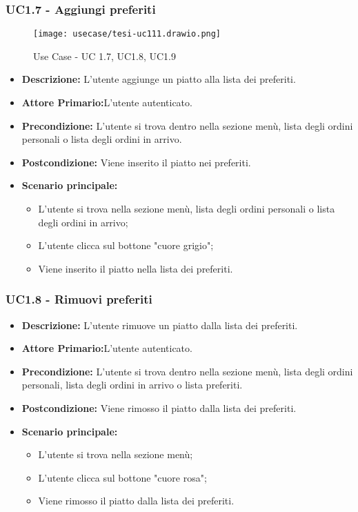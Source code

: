 \subsubsection{UC1.7 - Aggiungi preferiti}
\begin{figure}[H]
    \centering
    \texttt{[image: usecase/tesi-uc111.drawio.png]}
    \caption{Use Case - UC 1.7, UC1.8, UC1.9}
\end{figure}
\begin{itemize}
    \item \textbf{Descrizione:} L'utente aggiunge un piatto alla lista dei preferiti.
    \item \textbf{Attore Primario:}L'utente autenticato.
    \item \textbf{Precondizione:} L'utente si trova dentro nella sezione menù, lista degli ordini personali o lista degli ordini in arrivo.
    \item \textbf{Postcondizione:} Viene inserito il piatto nei preferiti.
    \item \textbf{Scenario principale:}
    \begin{itemize}
        \item L'utente si trova nella sezione menù, lista degli ordini personali o lista degli ordini in arrivo;
        \item L'utente clicca sul bottone "cuore grigio";
        \item Viene inserito il piatto nella lista dei preferiti.
    \end{itemize}
\end{itemize}
\subsubsection{UC1.8 - Rimuovi preferiti}
\begin{itemize}
    \item \textbf{Descrizione:} L'utente rimuove un piatto dalla lista dei preferiti.
    \item \textbf{Attore Primario:}L'utente autenticato.
    \item \textbf{Precondizione:} L'utente si trova dentro nella sezione menù, lista degli ordini personali, lista degli ordini in arrivo o lista preferiti.
    \item \textbf{Postcondizione:} Viene rimosso il piatto dalla lista dei preferiti.
    \item \textbf{Scenario principale:}
    \begin{itemize}
        \item L'utente si trova nella sezione menù;
        \item L'utente clicca sul bottone "cuore rosa";
        \item Viene rimosso il piatto dalla lista dei preferiti.
    \end{itemize}
\end{itemize}
